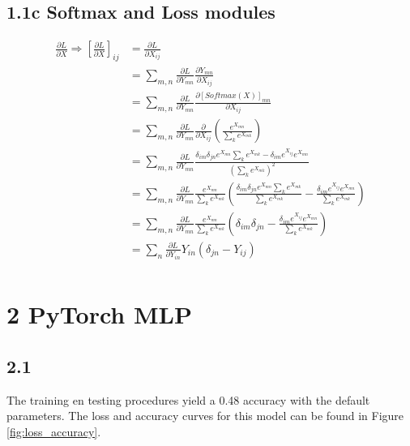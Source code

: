 \documentclass{article}
\begin{document}
\subsection*{1.1c Softmax and Loss modules}
\begin{align*}
    \frac{\partial L}{\partial X} \Rightarrow \left[\frac{\partial L}{\partial X}\right]_{ij} &= \frac{\partial L}{\partial X_{ij}} \\
                                                                                            &= \sum_{m,n}\frac{\partial L}{\partial Y_{mn}} \frac{\partial Y_{mn}}{\partial X_{ij}} \\
                                                                                              &= \sum_{m,n}\frac{\partial L}{\partial Y_{mn}} \frac{\partial [Softmax(X)]_{mn}}{\partial X_{ij}} \\
                                                                                              &= \sum_{m,n}\frac{\partial L}{\partial Y_{mn}} \frac{\partial}{\partial X_{ij}} \left(\frac{e^{X_{mn}}}{\sum_ke^{X_{mk}}}\right)\\
                                                                                              &= \sum_{m,n}\frac{\partial L}{\partial Y_{mn}} \frac{\delta_{im}\delta_{jn}e^{X_{mn}}\sum_ke^{X_{mk}} - \delta_{im}e^{X_{ij}}e^{X_{mn}}}{\left(\sum_ke^{X_{mk}}\right)^2}\\
                                                                                              &= \sum_{m,n}\frac{\partial L}{\partial Y_{mn}} \frac{e^{X_{mn}}}{\sum_ke^{X_{mk}}} \left(\frac{\delta_{im}\delta_{jn}e^{X_{mn}}\sum_ke^{X_{mk}}}{\sum_ke^{X_{mk}}} - \frac{\delta_{im}e^{X_{ij}}e^{X_{mn}}}{\sum_ke^{X_{mk}}}\right)\\
                                                                                              &= \sum_{m,n}\frac{\partial L}{\partial Y_{mn}} \frac{e^{X_{mn}}}{\sum_ke^{X_{mk}}} \left(\delta_{im}\delta_{jn} - \frac{\delta_{im}e^{X_{ij}}e^{X_{mn}}}{\sum_ke^{X_{mk}}}\right)\\
  &= \sum_{n}\frac{\partial L}{\partial Y_{in}} Y_{in} \left(\delta_{jn} - Y_{ij}\right)\\
\end{align*}


\section{2 PyTorch MLP}
\subsection{2.1}
The training en testing procedures yield a 0.48 accuracy with the default parameters. The loss and accuracy curves for this model can be found in Figure \ref{fig:loss_accuracy}.
\end{document}
